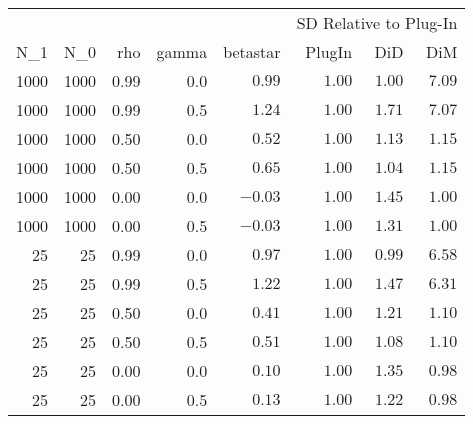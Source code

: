 \captionsetup[table]{labelformat=empty,skip=1pt}
\begin{longtable}{rrrrrrrr}
\toprule
 &  &  &  &  & \multicolumn{3}{c}{SD Relative to Plug-In} \\ 
 \cmidrule(lr){6-8}
N\_1 & N\_0 & rho & gamma & betastar & PlugIn & DiD & DiM \\ 
\midrule
1000 & 1000 & 0.99 & 0.0 & $0.99$ & $1.00$ & $1.00$ & $7.09$ \\ 
1000 & 1000 & 0.99 & 0.5 & $1.24$ & $1.00$ & $1.71$ & $7.07$ \\ 
1000 & 1000 & 0.50 & 0.0 & $0.52$ & $1.00$ & $1.13$ & $1.15$ \\ 
1000 & 1000 & 0.50 & 0.5 & $0.65$ & $1.00$ & $1.04$ & $1.15$ \\ 
1000 & 1000 & 0.00 & 0.0 & $-0.03$ & $1.00$ & $1.45$ & $1.00$ \\ 
1000 & 1000 & 0.00 & 0.5 & $-0.03$ & $1.00$ & $1.31$ & $1.00$ \\ 
25 & 25 & 0.99 & 0.0 & $0.97$ & $1.00$ & $0.99$ & $6.58$ \\ 
25 & 25 & 0.99 & 0.5 & $1.22$ & $1.00$ & $1.47$ & $6.31$ \\ 
25 & 25 & 0.50 & 0.0 & $0.41$ & $1.00$ & $1.21$ & $1.10$ \\ 
25 & 25 & 0.50 & 0.5 & $0.51$ & $1.00$ & $1.08$ & $1.10$ \\ 
25 & 25 & 0.00 & 0.0 & $0.10$ & $1.00$ & $1.35$ & $0.98$ \\ 
25 & 25 & 0.00 & 0.5 & $0.13$ & $1.00$ & $1.22$ & $0.98$ \\ 
 \bottomrule
\end{longtable}

